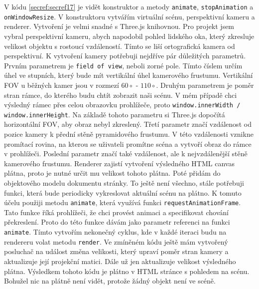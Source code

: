 \documentclass[czech,bachelor,dept420,male,cpdeclaration]{diploma}
\begin{document}
V kódu \ref{secref:secref17} je vidět konstruktor a metody \texttt{animate}, \texttt{stopAnimation} a \texttt{onWindowResize}. V konstruktoru vytvářím virtuální scénu, perspektivní kameru a renderer. Vytvoření je velmi snadné s Three.js knihovnou. Pro projekt jsem vybral perspektivní kameru, abych napodobil pohled lidského oka, který zkresluje velikost objektu s rostoucí vzdáleností. Tímto se liší ortografická kamera od perspektivní. K vytvoření kamery potřebuji nejdříve pár důležitých parametrů. Prvním parametrem je \texttt{field of view}, neboli zorné pole. Tímto číslem určím úhel ve stupních, který bude mít vertikální úhel kamerového frustumu. Vertikální FOV u běžných kamer jsou v rozmezí $60\circ$ - $110\circ$. Druhým parametrem je poměr stran rámce, do kterého budu chtít zobrazit naši scénu. V mém případě chci výsledný rámec přes celou obrazovku prohlížeče, proto \texttt{window.innerWidth / window.innerHeight}. Na základě tohoto parametru si Three.js dopočítá horizontální FOV, aby obraz nebyl zkreslený. Třetí parametr značí vzdálenost od pozice kamery k přední stěně pyramidového frustumu. V této vzdálenosti vznikne promítací rovina, na kterou se uživateli promítne scéna a vytvoří obraz do rámce v prohlížeči. Poslední parametr značí také vzdálenost, ale k nejvzdálenější stěně kamerového frustumu. Renderer zajistí vytvoření výsledného HTML canvas plátna, proto je nutné určit mu velikost tohoto plátna. Poté přidám do objektového modelu dokumentu stránky. To ještě není všechno, stále potřebuji funkci, která bude periodicky vykreslovat aktuální scénu na plátno. K tomuto účelu použiji metodu \texttt{animate}, která využívá funkci \texttt{requestAnimationFrame}. Tato funkce říká prohlížeči, že chci provést animaci a specifikovat chování překreslení. Proto do této funkce dávám jako parametr referenci na funkci \texttt{animate}. Tímto vytvořím nekonečný cyklus, kde v každé iteraci budu na rendereru volat metodu \texttt{render}. Ve zmíněném kódu ještě mám vytvořený posluchač na událost změna velikosti, který upraví poměr stran kamery a aktualizuje její projekční matici. Dále už jen aktualizuje velikost výsledného plátna. Výsledkem tohoto kódu je plátno v HTML stránce s pohledem na scénu. Bohužel nic na plátně není vidět, protože žádný objekt není ve scéně.
\end{document}
